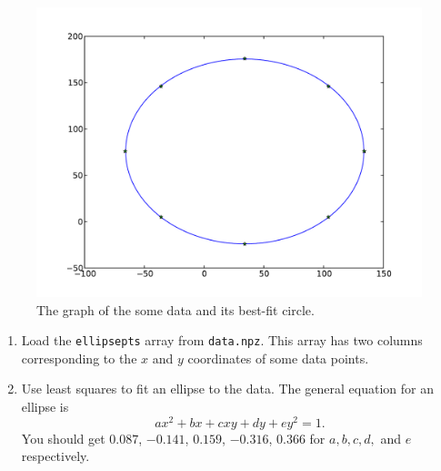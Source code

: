 \begin{figure}
\begin{center}
\includegraphics[width=\textwidth]{circle.pdf}
\caption{The graph of the some data and its best-fit circle.}
\label{fig:circle}
\end{center}
\end{figure}

\begin{problem}
\leavevmode
\begin{enumerate}
\item Load the \texttt{ellipsepts} array from \texttt{data.npz}. This array has two columns corresponding to the $x$ and $y$ coordinates of some data points.
\item Use least squares to fit an ellipse to the data. 
The general equation for an ellipse is
\[
ax^2 + bx + cxy + dy + ey^2 = 1.
\]
You should get  $0.087$, $-0.141$,  $0.159$, $-0.316$, $0.366$ for $a, b, c, d,$ and $e$ respectively.
\end{enumerate}
\end{problem}

